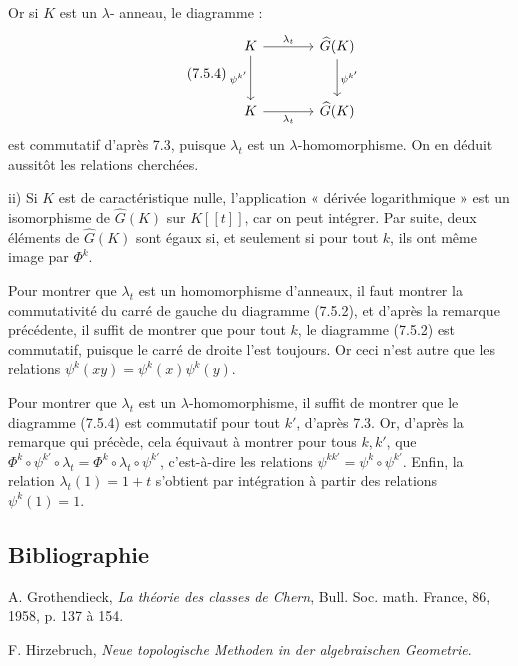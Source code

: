 Or si \(K\) est un \(\lambda\)-
anneau, le diagramme :
\begin{equation}\tag{7.5.4}
\begin{tikzcd}[column sep=large,row sep=large]
K \arrow[r,"\lambda_t"] \arrow[d,"\psi^{k'}"'] &
\widehat G(K) \arrow[d,"\psi^{k'}"]\\
K \arrow[r,"\lambda_t"'] &
\widehat G(K)
\end{tikzcd}
\end{equation}
est commutatif d'après 7.3, puisque \(\lambda_t\) est un \(\lambda\)-homomorphisme. On en déduit aussitôt les relations cherchées.

ii) Si \(K\) est de caractéristique nulle, l'application « dérivée logarithmique » est un isomorphisme de \(\widehat G(K)\) sur \(K[[t]]\), car on peut intégrer. Par suite, deux éléments de \(\widehat G(K)\) sont égaux si, et seulement si pour tout \(k\), ils ont même image par \(\Phi^k\).

Pour montrer que \(\lambda_t\) est un homomorphisme d'anneaux, il faut montrer la commutativité du carré de gauche du diagramme (7.5.2), et d'après la remarque précédente, il suffit de montrer que pour tout \(k\), le diagramme (7.5.2) est commutatif, puisque le carré de droite l'est toujours. Or ceci n'est autre que les relations \(\psi^k(xy)=\psi^k(x)\psi^k(y)\).

Pour montrer que \(\lambda_t\) est un \(\lambda\)-homomorphisme, il suffit de montrer que le diagramme (7.5.4) est commutatif pour tout \(k'\), d'après 7.3. Or, d'après la remarque qui précède, cela équivaut à montrer pour tous \(k,k'\), que \(\Phi^k\circ\psi^{k'}\circ\lambda_t=\Phi^k\circ\lambda_t\circ\psi^{k'}\), c'est-à-dire les relations \(\psi^{kk'}=\psi^k\circ\psi^{k'}\). Enfin, la relation \(\lambda_t(1)=1+t\) s'obtient par intégration à partir des relations \(\psi^k(1)=1\).

\subsection*{Bibliographie}
\begin{enumerate}[label={[\arabic*]}]
\item A. Grothendieck, \emph{La théorie des classes de Chern}, Bull. Soc. math. France, 86, 1958, p. 137 à 154.
\item F. Hirzebruch, \emph{Neue topologische Methoden in der algebraischen Geometrie}.
\end{enumerate}



